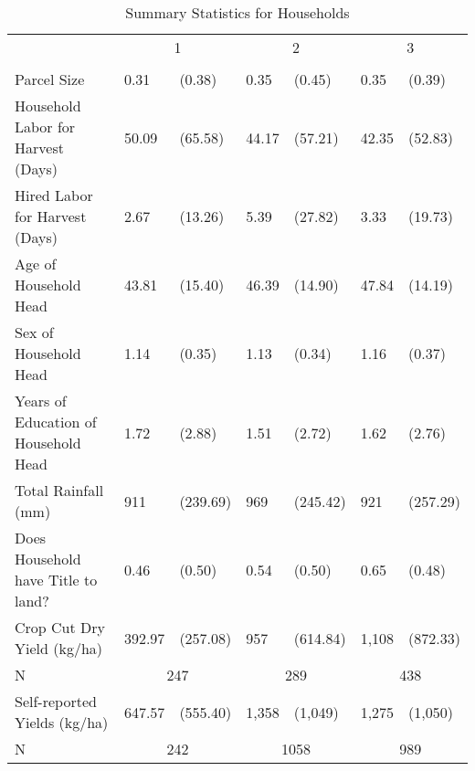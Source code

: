 \begin{table}
\caption{Summary Statistics for Households}
\label{tbl:summary}
\begin{tabular}{lllllll}
\toprule
 & \multicolumn{2}{c}{1} & \multicolumn{2}{c}{2} & \multicolumn{2}{c}{3} \\
 &  &  &  &  &  &  \\
\midrule
Parcel Size & 0.31 & (0.38) & 0.35 & (0.45) & 0.35 & (0.39) \\
Household Labor for Harvest (Days) & 50.09 & (65.58) & 44.17 & (57.21) & 42.35 & (52.83) \\
Hired Labor for Harvest (Days) & 2.67 & (13.26) & 5.39 & (27.82) & 3.33 & (19.73) \\
Age of Household Head & 43.81 & (15.40) & 46.39 & (14.90) & 47.84 & (14.19) \\
Sex of Household Head & 1.14 & (0.35) & 1.13 & (0.34) & 1.16 & (0.37) \\
Years of Education of Household Head & 1.72 & (2.88) & 1.51 & (2.72) & 1.62 & (2.76) \\
Total Rainfall (mm) & 911 & (239.69) & 969 & (245.42) & 921 & (257.29) \\
Does Household have Title to land? & 0.46 & (0.50) & 0.54 & (0.50) & 0.65 & (0.48) \\
Crop Cut Dry Yield (kg/ha) & 392.97 & (257.08) & 957 & (614.84) & 1,108 & (872.33) \\
\midrule
N & \multicolumn{2}{c}{247}&\multicolumn{2}{c}{289}&\multicolumn{2}{c}{438}\\
\midrule
Self-reported Yields (kg/ha) & 647.57 & (555.40) & 1,358 & (1,049) & 1,275 & (1,050) \\
\midrule
N & \multicolumn{2}{c}{242}&\multicolumn{2}{c}{1058}&\multicolumn{2}{c}{989}\\
\bottomrule
\end{tabular}
\end{table}
